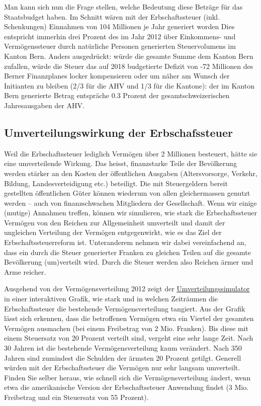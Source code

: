 \documentclass[a4paper, 12pt,liststotoc]{scrartcl}
\numberwithin{equation}{section}
\begin{document}
Man kann sich nun die Frage stellen, welche Bedeutung diese Beträge für
das Staatsbudget haben. Im Schnitt wären mit der Erbschaftssteuer (inkl.
Schenkungen) Einnahmen von 104 Millionen je Jahr generiert worden Dies
entspricht immerhin drei Prozent des im Jahr 2012 über Einkommens- und
Vermögenssteuer durch natürliche Personen generierten Steuervolumens im
Kanton Bern. Anders ausgedrückt: würde die gesamte Summe dem Kanton Bern
zufallen, würde die Steuer das auf 2018 budgetierte Defizit von -72
Millionen des Berner Finanzplanes locker kompensieren oder um näher am
Wunsch der Initianten zu bleiben (2/3 für die AHV und 1/3 für die
Kantone): der im Kanton Bern generierte Betrag entspräche 0.3 Prozent
der gesamtschweizerischen Jahresausgaben der AHV.

\subsection{Umverteilungswirkung der
Erbschafssteuer}\label{umverteilungswirkung-der-erbschafssteuer}

Weil die Erbschaftssteuer lediglich Vermögen über 2 Millionen besteuert,
hätte sie eine umverteilende Wirkung. Das heisst, finanzstarke Teile der
Bevölkerung werden stärker an den Kosten der öffentlichen Ausgaben
(Altersvorsorge, Verkehr, Bildung, Landesverteidigung etc.) beteiligt.
Die mit Steuergeldern bereit gestellten öffentlichen Güter können
wiederum von allen gleichermassen genutzt werden -- auch von
finanzschwachen Mitgliedern der Gesellschaft. Wenn wir einige (mutige)
Annahmen treffen, können wir simulieren, wie stark die Erbschaftssteuer
Vermögen von den Reichen zur Allgemeinheit umverteilt und damit der
ungleichen Verteilung der Vermögen entgegenwirkt, wie es das Ziel der
Erbschaftssteuerreform ist. Unteranderem nehmen wir dabei vereinfachend
an, dass ein durch die Steuer generierter Franken zu gleichen Teilen auf
die gesamte Bevölkerung (um)verteilt wird. Durch die Steuer werden also
Reichen ärmer und Arme reicher.

Ausgehend von der Vermögensverteilung 2012 zeigt der
\href{https://inequalities.shinyapps.io/simulation/}{Umverteilungssimulator}
in einer interaktiven Grafik, wie stark und in welchen Zeiträumen die
Erbschaftssteuer die bestehende Vermögensverteilung tangiert. Aus der
Grafik lässt sich erkennen, dass die betroffenen Vermögen etwa ein
Viertel der gesamten Vermögen ausmachen (bei einem Freibetrag von 2 Mio.
Franken). Bis diese mit einem Steuersatz von 20 Prozent verteilt sind,
vergeht eine sehr lange Zeit. Nach 30 Jahren ist die bestehende
Vermögensverteilung kaum verändert. Nach 350 Jahren sind zumindest die
Schulden der ärmsten 20 Prozent getilgt. Generell würden mit der
Erbschaftssteuer die Vermögen nur sehr langsam umverteilt. Finden Sie
selber heraus, wie schnell sich die Vermögensverteilung ändert, wenn
etwa die amerikanische Version der Erbschaftssteuer Anwendung findet (3
Mio. Freibetrag und ein Steuersatz von 55 Prozent).
\end{document}
